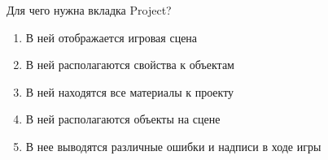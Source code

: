 
Для чего нужна вкладка Project?

\begin{enumerate}
    \item В ней отображается игровая сцена
    \item В ней располагаются свойства к объектам
    \item В ней находятся все материалы к проекту
    \item В ней располагаются объекты на сцене
    \item В нее выводятся различные ошибки и надписи в ходе игры
\end{enumerate}